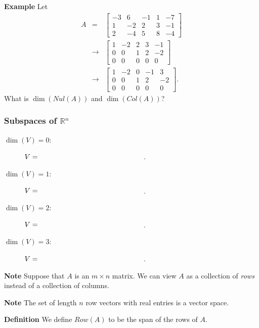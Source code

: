  \begin{frame}[fragile]
\textbf{Example}
Let 
\begin{eqnarray*}
A&=&\left[\begin{array}{rrrrr} -3 & 6& -1& 1& -7\\ 1& -2&2&3&-1\\ 2&-4&5&8&-4\end{array}\right]  \\
&\rightarrow& \left[\begin{array}{rrrrr} 1&-2&2&3&-1\\ 0&0&1&2&-2\\0&0&0&0&0\end{array}\right] \\ 
&\rightarrow& \left[\begin{array}{rrrrr} 1&-2&0&-1&3\\0&0&1&2&-2\\0&0&0&0&0\end{array}\right].
\end{eqnarray*}
What is $\dim( Nul(A))$ and $\dim(Col(A))$?

\end{frame}





 \begin{frame}[fragile]\frametitle{Subspaces of $\mathbb R^n$}
\begin{description}
  \item[$\dim(V)=0$:] $V= \textbf{ \hspace{50 mm}}$.
  \item[$\dim(V)=1$:] $V= \textbf{ \hspace{50 mm}}$.
  \item[$\dim(V)=2$:] $V= \textbf{ \hspace{50 mm}}$.
  \item[$\dim(V)=3$:] $V= \textbf{ \hspace{50 mm}}$.
\end{description}
\end{frame}



 \begin{frame}[fragile]
\textbf{Note}
Suppose that $A$ is an $m\times n$ matrix.  We can view $A$ as a collection of {\em rows} instead of a collection of columns.



\textbf{Note}
The set of length $n$ row vectors with real entries is a vector space.



\textbf{Definition}
We define $Row(A)$ to be the span of the rows of $A$.

\end{frame}





